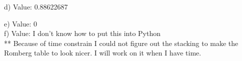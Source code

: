 \documentclass{article}
\begin{document}
\begin{figure}[H]
\end{figure}

d) Value: 0.88622687
\begin{figure}[H]
\end{figure}
e) Value: 0\\
f) Value: I don't know how to put this into Python\\
** Because of time constrain I could not figure out the stacking to make the Romberg table to look nicer. I will work on it when I have time.
\end{document}
